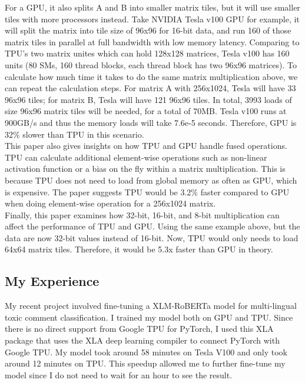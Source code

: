 \documentclass[conference]{IEEEtran}
\begin{document}
	For a GPU, it also splits A and B into smaller matrix tiles, but it will use smaller tiles with more processors instead. Take NVIDIA Tesla v100 GPU for example, it will split the matrix into tile size of 96x96 for 16-bit data, and run 160 of those matrix tiles in parallel at full bandwidth with low memory latency. Comparing to TPU's two matrix unites which can hold 128x128 matrices, Tesla v100 has 160 units (80 SMs, 160 thread blocks, each thread block has two 96x96 matrices). To calculate how much time it takes to do the same matrix multiplication above, we can repeat the calculation steps. For matrix A with 256x1024, Tesla will have 33 96x96 tiles; for matrix B, Tesla will have 121 96x96 tiles. In total, 3993 loads of size 96x96 matrix tiles will be needed, for a total of 70MB. Tesla v100 runs at 900GB/s and thus the memory loads will take 7.6e-5 seconds. Therefore, GPU is 32\% slower than TPU in this scenario.\\
	
	This paper \cite{tpubert} also gives insights on how TPU and GPU handle fused operations. TPU can calculate additional element-wise operations such as non-linear activation function or a bias on the fly within a matrix multiplication. This is because TPU does not need to load from global memory as often as GPU, which is expensive. The paper suggests TPU would be 3.2\% faster compared to GPU when doing element-wise operation for a 256x1024 matrix.\\
	
	Finally, this paper \cite{tpubert} examines how 32-bit, 16-bit, and 8-bit multiplication can affect the performance of TPU and GPU. Using the same example above, but the data are now 32-bit values instead of 16-bit. Now, TPU would only needs to load 64x64 matrix tiles. Therefore, it would be 5.3x faster than GPU in theory.\\
	
	\subsection{My Experience}	 
	My recent project involved fine-tuning a XLM-RoBERTa\cite{XLM-ROBERTA} model for multi-lingual toxic comment classification. I trained my model both on GPU and TPU. Since there is no direct support from Google TPU for PyTorch, I used this XLA package \cite{xla} that uses the XLA deep learning compiler to connect PyTorch with Google TPU. My model took around 58 minutes on Tesla V100 and only took around 12 minutes on TPU. This speedup allowed me to further fine-tune my model since I do not need to wait for an hour to see the result.
	
\end{document}
